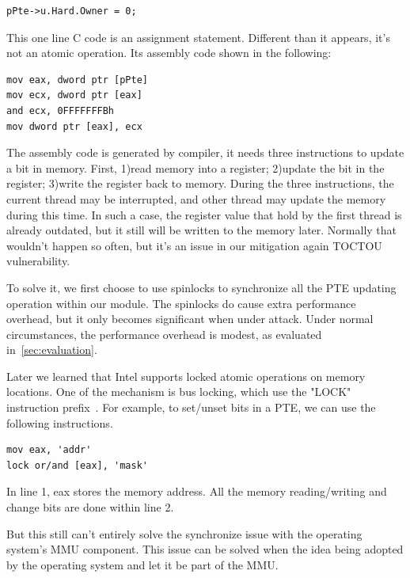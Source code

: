 \begin{lstlisting}[style=code] 
pPte->u.Hard.Owner = 0;
\end{lstlisting}

This one line C code is an assignment statement. Different than it appears, it's not an atomic operation. Its assembly code shown in the following:

\begin{lstlisting}[style=code] 
mov eax, dword ptr [pPte]
mov ecx, dword ptr [eax]
and ecx, 0FFFFFFFBh
mov dword ptr [eax], ecx
\end{lstlisting}

The assembly code is generated by compiler, it needs three instructions to update a bit in memory. First, 1)read memory into a register; 2)update the bit in the register; 3)write the register back to memory. During the three instructions, the current thread may be interrupted, and other thread may update the memory during this time. In such a case, the register value that hold by the first thread is already outdated, but it still will be written to the memory later. Normally that wouldn't happen so often, but it's an issue in our mitigation again TOCTOU vulnerability.

To solve it, we first choose to use spinlocks to synchronize all the PTE updating operation within our module. The spinlocks do cause extra performance overhead, but it only becomes significant when under attack. Under normal circumstances, the performance overhead is modest, as evaluated in~\autoref{sec:evaluation}.  

Later we learned that Intel supports locked atomic operations on memory locations. One of the mechanism is bus locking, which use the "LOCK" instruction prefix~\cite{intelmanualchapter8}. For example, to set/unset bits in a PTE, we can use the following instructions.

\begin{lstlisting}[style=code] 
mov eax, 'addr'
lock or/and [eax], 'mask'
\end{lstlisting}

In line 1, eax stores the memory address. All the memory reading/writing and change bits are done within line 2.

But this still can't entirely solve the synchronize issue with the operating system's MMU component. This issue can be solved when the idea being adopted by the operating system and let it be part of the MMU. 

